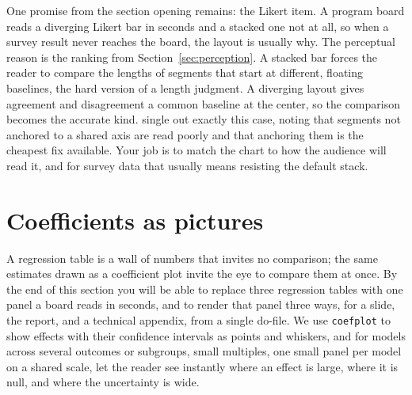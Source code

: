 \documentclass[
    a4paper,
    fontsize=10pt,
    twoside=true,
    numbers=noenddot,
]{kaobook}
\begin{document}
One promise from the section opening remains: the Likert item. A program board reads a diverging Likert bar in seconds and a stacked one not at all, so when a survey result never reaches the board, the layout is usually why. The perceptual reason is the ranking from Section~\ref{sec:perception}. A stacked bar forces the reader to compare the lengths of segments that start at different, floating baselines, the hard version of a length judgment. A diverging layout gives agreement and disagreement a common baseline at the center, so the comparison becomes the accurate kind. \textcite{franconeri2021science} single out exactly this case, noting that segments not anchored to a shared axis are read poorly and that anchoring them is the cheapest fix available. Your job is to match the chart to how the audience will read it, and for survey data that usually means resisting the default stack.

\section{Coefficients as pictures}
A regression table is a wall of numbers that invites no comparison; the same estimates drawn as a coefficient plot invite the eye to compare them at once. By the end of this section you will be able to replace three regression tables with one panel a board reads in seconds, and to render that panel three ways, for a slide, the report, and a technical appendix, from a single do-file. We use \texttt{coefplot} to show effects with their confidence intervals as points and whiskers, and for models across several outcomes or subgroups, small multiples, one small panel per model on a shared scale, let the reader see instantly where an effect is large, where it is null, and where the uncertainty is wide.
\end{document}
